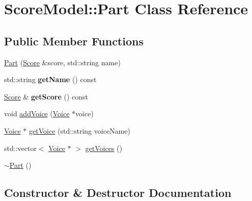 \hypertarget{classScoreModel_1_1Part}{}\section{Score\+Model\+::Part Class Reference}
\label{classScoreModel_1_1Part}
\subsection*{Public Member Functions}
\begin{DoxyCompactItemize}
\item 
\mbox{\hyperlink{classScoreModel_1_1Part_a03dd8a9dfcb1b5f21df06c8dc78aa255}{Part}} (\mbox{\hyperlink{classScoreModel_1_1Score}{Score}} \&score, std\+::string name)
\item 
\mbox{\label{classScoreModel_1_1Part_a2c2a56357258366b40184b31df3e8f02}} 
std\+::string {\bfseries get\+Name} () const
\item 
\mbox{\label{classScoreModel_1_1Part_a8fbd88501acf4bbab8b917293983f6c1}} 
\mbox{\hyperlink{classScoreModel_1_1Score}{Score}} \& {\bfseries get\+Score} () const
\item 
void \mbox{\hyperlink{classScoreModel_1_1Part_ad022dd411522ff8a8c001b93bd65c2a4}{add\+Voice}} (\mbox{\hyperlink{classScoreModel_1_1Voice}{Voice}} $\ast$voice)
\item 
\mbox{\hyperlink{classScoreModel_1_1Voice}{Voice}} $\ast$ \mbox{\hyperlink{classScoreModel_1_1Part_afeca4670f40c43b42343d55f71d242af}{get\+Voice}} (std\+::string voice\+Name)
\item 
std\+::vector$<$ \mbox{\hyperlink{classScoreModel_1_1Voice}{Voice}} $\ast$ $>$ \mbox{\hyperlink{classScoreModel_1_1Part_a7b8ea977e2ade4d71c73319ac5629145}{get\+Voices}} ()
\item 
\mbox{\hyperlink{classScoreModel_1_1Part_aa9f6951242b54a9ab4cd953bb2879238}{$\sim$\+Part}} ()
\end{DoxyCompactItemize}


\subsection{Constructor \& Destructor Documentation}
\mbox{\label{classScoreModel_1_1Part_a03dd8a9dfcb1b5f21df06c8dc78aa255}} 

